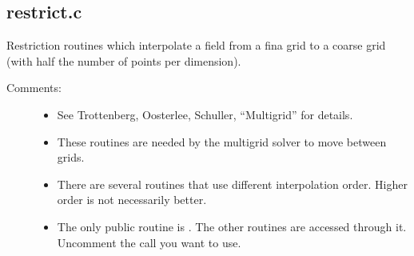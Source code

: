 \documentclass[letterpaper,10pt,english]{sphinxmanual}
\begin{document}
\subsection{restrict.c}
\label{\detokenize{sphinx-c-apidoc/output/gravity/restrict_c:restrict-c}}\label{\detokenize{sphinx-c-apidoc/output/gravity/restrict_c::doc}}
Restriction routines which interpolate a field from a fina grid to a coarse grid (with half the number of points per dimension).
\begin{description}
\item[{Comments:}] \leavevmode\begin{itemize}
\item {} 
See Trottenberg, Oosterlee, Schuller, “Multigrid” for details.

\item {} 
These routines are needed by the multigrid solver to move between grids.

\item {} 
There are several routines that use different interpolation order.  Higher order is not necessarily better.

\item {} 
The only public routine is .  The other routines are accessed through it.  Uncomment the call you want to use.

\end{itemize}

\end{description}

\begin{fulllineitems}
\label{\detokenize{sphinx-c-apidoc/output/gravity/restrict_c:c.restrict_grid}}%
\pysigstartmultiline
{}%
\pysigstopmultiline
\end{fulllineitems}


\begin{fulllineitems}
\label{\detokenize{sphinx-c-apidoc/output/gravity/restrict_c:c.restrict_grid_cospatial}}%
\pysigstartmultiline
{}%
\pysigstopmultiline
\end{fulllineitems}
\end{document}
